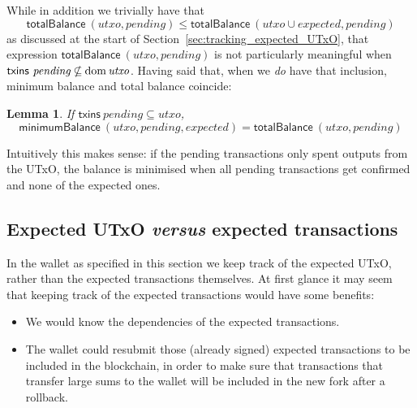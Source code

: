 \documentclass{article}
\DeclareMathOperator{\dom}{dom}
\newtheorem{lemma}{Lemma}[section] %
\numberwithin{equation}{lemma}
\begin{document}
While in addition we trivially have that
%
\begin{equation*}
    \mathsf{totalBalance} ~ (\mathit{utxo}, \mathit{pending})
\le \mathsf{totalBalance} ~ (\mathit{utxo} \cup \mathit{expected}, \mathit{pending})
\end{equation*}
%
as discussed at the start of Section~\ref{sec:tracking_expected_UTxO}, that expression
\begin{math}
\mathsf{totalBalance} ~ (\mathit{utxo}, \mathit{pending})
\end{math}
is not particularly meaningful when
\begin{math}
\mathsf{txins} ~ \mathit{pending} \mathbin{\slashed\subseteq} \dom \mathit{utxo}
\end{math}. Having said that, when we \emph{do} have that inclusion, minimum
balance and total balance coincide:
%
\begin{lemma}
If $\mathsf{txins} ~ \mathit{pending} \subseteq \mathit{utxo}$,
\begin{equation*}
  \mathsf{minimumBalance} ~ (\mathit{utxo}, \mathit{pending}, \mathit{expected})
= \mathsf{totalBalance} ~ (\mathit{utxo}, \mathit{pending})
\end{equation*}
\label{lem:minimumBalance_equal_totalBalance}
\end{lemma}
%
Intuitively this makes sense: if the pending transactions only spent outputs
from the UTxO, the balance is minimised when all pending transactions get
confirmed and none of the expected ones.

\subsection{Expected UTxO \emph{versus} expected transactions}

In the wallet as specified in this section we keep track of the expected UTxO,
rather than the expected transactions themselves. At first glance it may seem
that keeping track of the expected transactions would have some benefits:

\begin{itemize}
\item We would know the dependencies of the expected transactions.
\item The wallet could resubmit those (already signed) expected transactions to
be included in the blockchain, in order to make sure that transactions that
transfer large sums to the wallet will be included in the new fork after a
rollback.
\end{itemize}
\end{document}
